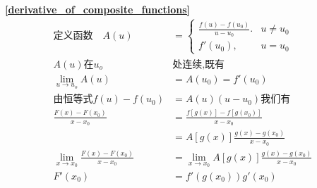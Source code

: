 \textbf{\large \ref{derivative_of_composite_functions}}
\begin{displaymath}
    \begin{split}
        \mbox{定义函数}\quad A(u)&=\begin{cases}
            \frac{f(u)-f(u_0)}{u-u_0}. &u\neq u_0\\
            f'(u_0),&u= u_0
        \end{cases}\\
        A(u)\mbox{在}u_o&\mbox{处连续,既有}\\
        \lim\limits_{u\to u_o}A(u)&=A(u_0)=f'(u_0)\\
        \mbox{由恒等式}f(u)-f(u_0)&=A(u)(u-u_0)\mbox{我们有}\\
        \frac{F(x)-F(x_0)}{x-x_0}&=\frac{f\left[g(x)\right]-f\left[g(x_0)\right]}{x-x_0}\\
        &=A\left[g(x)\right]\frac{g(x)-g(x_0)}{x-x_0}\\
        \lim\limits_{x\to x_0}\frac{F(x)-F(x_0)}{x-x_0}&=\lim\limits_{x\to x_0}A\left[g(x)\right]\frac{g(x)-g(x_0)}{x-x_0}\\
        F'(x_0)&=f'(g(x_0))g'(x_0)
    \end{split}
\end{displaymath}